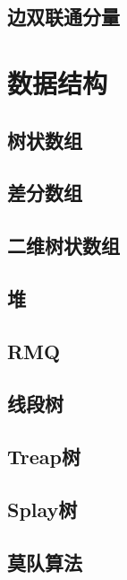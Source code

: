 \section{边双联通分量}
\raggedbottom
\hrulefill

\chapter{数据结构}
\section{树状数组}
\raggedbottom
\hrulefill
\section{差分数组}
\raggedbottom
\hrulefill
\section{二维树状数组}
\raggedbottom
\hrulefill
\section{堆}
\raggedbottom
\hrulefill
\section{RMQ}
\raggedbottom
\hrulefill
\section{线段树}
\raggedbottom
\hrulefill
\section{Treap树}
\raggedbottom
\hrulefill
\section{Splay树}
\raggedbottom
\hrulefill
\section{莫队算法}
\raggedbottom
\hrulefill

